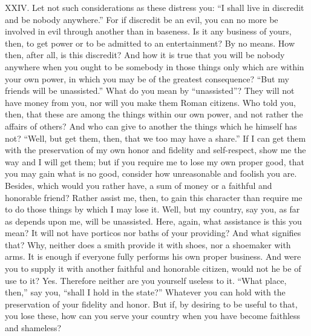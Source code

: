 \documentclass[a4paper]{article}
\begin{document}
XXIV. Let not such considerations as these distress you: “I shall live in
discredit and be nobody anywhere.” For if discredit be an evil, you can
no more be involved in evil through another than in baseness. Is it any
business of yours, then, to get power or to be admitted to an
entertainment? By no means. How then, after all, is this discredit? And
how it is true that you will be nobody anywhere when you ought to be
somebody in those things only which are within your own power, in which
you may be of the greatest consequence? “But my friends will be
unassisted.” What do you mean by “unassisted”? They will not have money
from you, nor will you make them Roman citizens. Who told you, then, that
these are among the things within our own power, and not rather the
affairs of others? And who can give to another the things which he
himself has not? “Well, but get them, then, that we too may have a
share.” If I can get them with the preservation of my own honor and
fidelity and self-respect, show me the way and I will get them; but if
you require me to lose my own proper good, that you may gain what is no
good, consider how unreasonable and foolish you are. Besides, which would
you rather have, a sum of money or a faithful and honorable friend?
Rather assist me, then, to gain this character than require me to do
those things by which I may lose it. Well, but my country, say you, as
far as depends upon me, will be unassisted. Here, again, what assistance
is this you mean? It will not have porticos nor baths of your providing?
And what signifies that? Why, neither does a smith provide it with shoes,
nor a shoemaker with arms. It is enough if everyone fully performs his
own proper business. And were you to supply it with another faithful and
honorable citizen, would not he be of use to it? Yes. Therefore neither
are you yourself useless to it. “What place, then,” say you, “shall I
hold in the state?” Whatever you can hold with the preservation of your
fidelity and honor. But if, by desiring to be useful to that, you lose
these, how can you serve your country when you have become faithless and
shameless?
\end{document}
